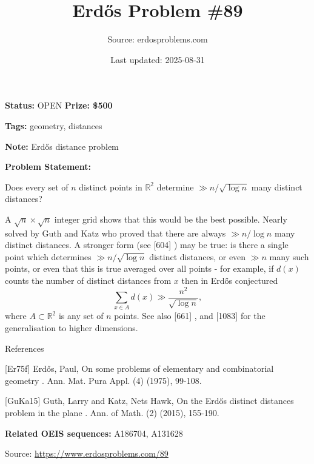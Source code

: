 \documentclass{article}
\title{Erd\H{o}s Problem \#89}
\date{Last updated: 2025-08-31}
\author{Source: erdosproblems.com}
\begin{document}
\maketitle

\noindent\textbf{Status:} OPEN \quad \textbf{Prize: \$500}

\noindent\textbf{Tags:} geometry, distances

\medskip
\noindent\textbf{Note:} Erdős distance problem

\medskip

\noindent\textbf{Problem Statement:}

Does every set of $n$ distinct points in $\mathbb{R}^2$ determine $\gg n/\sqrt{\log n}$ many distinct distances?




A $\sqrt{n}\times\sqrt{n}$ integer grid shows that this would be the best possible. Nearly solved by Guth and Katz \cite{GuKa15} who proved that there are always $\gg n/\log n$ many distinct distances. A stronger form (see [604] ) may be true: is there a single point which determines $\gg n/\sqrt{\log n}$ distinct distances, or even $\gg n$ many such points, or even that this is true averaged over all points - for example, if $d(x)$ counts the number of distinct distances from $x$ then in \cite{Er75f} Erd\H{o}s conjectured\[\sum_{x\in A}d(x) \gg \frac{n^2}{\sqrt{\log n}},\]where $A\subset \mathbb{R}^2$ is any set of $n$ points. See also [661] , and [1083] for the generalisation to higher dimensions.




References

[Er75f] Erd\H{o}s, Paul, On some problems of elementary and combinatorial geometry . Ann. Mat. Pura Appl. (4) (1975), 99-108.

[GuKa15] Guth, Larry and Katz, Nets Hawk, On the Erd\H{o}s distinct distances problem in the plane . Ann. of Math. (2) (2015), 155-190.

\noindent\textbf{Related OEIS sequences:} A186704, A131628


\bigskip
\noindent\small{Source: \url{https://www.erdosproblems.com/89}}
\end{document}
